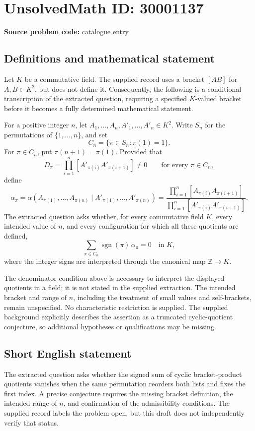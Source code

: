 \documentclass[11pt]{article}
\newcommand{\Z}{\mathbb{Z}}
\begin{document}
\section*{UnsolvedMath ID: 30001137}
\textbf{Source problem code:} catalogue entry
\subsection{Definitions and mathematical statement}
Let \(K\) be a commutative field. The supplied record uses a bracket \([AB]\) for \(A,B\in K^2\), but does not define it. Consequently, the following is a conditional transcription of the extracted question, requiring a specified \(K\)-valued bracket before it becomes a fully determined mathematical statement.

For a positive integer \(n\), let \(A_1,\ldots,A_n,A'_1,\ldots,A'_n\in K^2\). Write \(S_n\) for the permutations of \(\{1,\ldots,n\}\), and set
\[
C_n=\{\pi\in S_n:\pi(1)=1\}.
\]
For \(\pi\in C_n\), put \(\pi(n+1)=\pi(1)\). Provided that
\[
D_\pi=\prod_{i=1}^n[A'_{\pi(i)}A'_{\pi(i+1)}]\ne0
\qquad\text{for every }\pi\in C_n,
\]
define
\[
\alpha_\pi=
\alpha(A_{\pi(1)},\ldots,A_{\pi(n)}\mid A'_{\pi(1)},\ldots,A'_{\pi(n)})
=\frac{\displaystyle\prod_{i=1}^n[A_{\pi(i)}A_{\pi(i+1)}]}{\displaystyle\prod_{i=1}^n[A'_{\pi(i)}A'_{\pi(i+1)}]}.
\]
The extracted question asks whether, for every commutative field \(K\), every intended value of \(n\), and every configuration for which all these quotients are defined,
\[
\sum_{\pi\in C_n}\operatorname{sgn}(\pi)\,\alpha_\pi=0
\quad\text{in }K,
\]
where the integer signs are interpreted through the canonical map \(\Z\to K\).

The denominator condition above is necessary to interpret the displayed quotients in a field; it is not stated in the supplied extraction. The intended bracket and range of \(n\), including the treatment of small values and self-brackets, remain unspecified. No characteristic restriction is supplied. The supplied background explicitly describes the assertion as a truncated cyclic-quotient conjecture, so additional hypotheses or qualifications may be missing.
\subsection{Short English statement}
The extracted question asks whether the signed sum of cyclic bracket-product quotients vanishes when the same permutation reorders both lists and fixes the first index. A precise conjecture requires the missing bracket definition, the intended range of \(n\), and confirmation of the admissibility conditions. The supplied record labels the problem open, but this draft does not independently verify that status.
\end{document}
